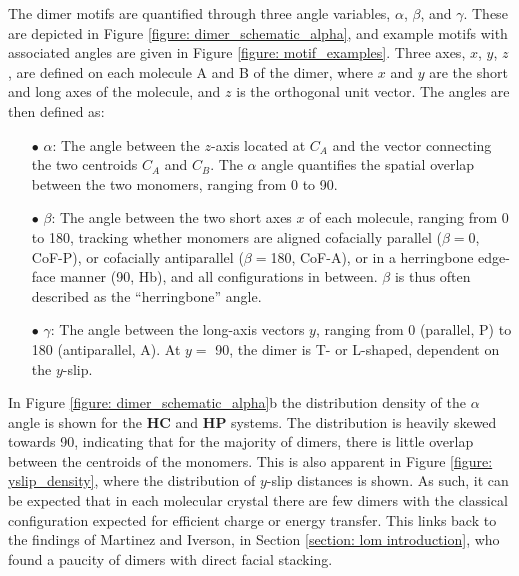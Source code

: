 The dimer motifs are quantified through three angle variables, $\alpha$, $\beta$, and $\gamma$. These are depicted in Figure \ref{figure: dimer_schematic_alpha}, and example motifs with associated angles are given in Figure \ref{figure: motif_examples}. Three axes, $x$, $y$, $z$, are defined on each molecule A and B of the dimer, where $x$ and $y$ are the short and long axes of the molecule, and $z$ is the orthogonal unit vector. The angles are then defined as:
\begin{itemize}
\item[$\bullet$] $\alpha$: The angle between the $z$-axis located at $C_{A}$ and the vector connecting the two centroids $C_{A}$ and $C_{B}$.  The $\alpha$ angle quantifies the spatial overlap between the two monomers, ranging from 0\degree{} to 90\degree{}. 

\item[$\bullet$] $\beta$: The angle between the two short axes $x$ of each molecule, ranging from 0\degree{} to 180\degree{}, tracking whether monomers are aligned cofacially parallel ($\beta=$0\degree{}, CoF-P), or cofacially antiparallel ($\beta=$180\degree{}, CoF-A), or in a herringbone edge-face manner (90\degree{}, Hb), and all configurations in between. $\beta$ is thus often described as the ``herringbone'' angle. 

\item[$\bullet$] $\gamma$: The angle between the long-axis vectors $y$, ranging from 0\degree{} (parallel, P) to 180\degree{} (antiparallel, A). At $y=$ 90\degree{}, the dimer is T- or L-shaped, dependent on the $y$-slip. 
\end{itemize}

In Figure \ref{figure: dimer_schematic_alpha}b the distribution density of the $\alpha$ angle is shown for the \textbf{HC} and \textbf{HP} systems. The distribution is heavily skewed towards 90\degree, indicating that for the majority of dimers, there is little overlap between the centroids of the monomers. This is also apparent in Figure \ref{figure: yslip_density}, where the distribution of $y$-slip distances is shown. As such, it can be expected that in each molecular crystal there are few dimers with the classical configuration expected for efficient charge or energy transfer. This links back to the findings of Martinez and Iverson, in Section \ref{section: lom introduction}, who found a paucity of dimers with direct facial stacking.\cite{Martinez2012}

